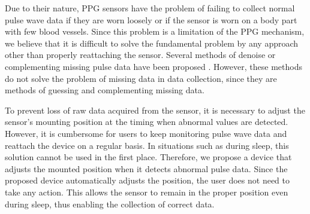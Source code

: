 \documentclass[sigconf]{acmart}
\begin{document}
Due to their nature, PPG sensors have the problem of failing to collect normal pulse wave data if they are worn loosely or if the sensor is worn on a body part with few blood vessels. Since this problem is a limitation of the PPG mechanism, we believe that it is difficult to solve the fundamental problem by any approach other than properly reattaching the sensor. Several methods of denoise or complementing missing pulse data have been proposed \cite{pulse_data_denoise_keerthiveena, pulse_data_denoise_george, pulse_data_denoise_mishra, pulse_data_completion_hangsik}. However, these methods do not solve the problem of missing data in data collection, since they are methods of guessing and complementing missing data.\par

To prevent loss of raw data acquired from the sensor, it is necessary to adjust the sensor's mounting position at the timing when abnormal values are detected. However, it is cumbersome for users to keep monitoring pulse wave data and reattach the device on a regular basis. In situations such as during sleep, this solution cannot be used in the first place. Therefore, we propose a device that adjusts the mounted position when it detects abnormal pulse data. Since the proposed device automatically adjusts the position, the user does not need to take any action. This allows the sensor to remain in the proper position even during sleep, thus enabling the collection of correct data.\par
\end{document}
